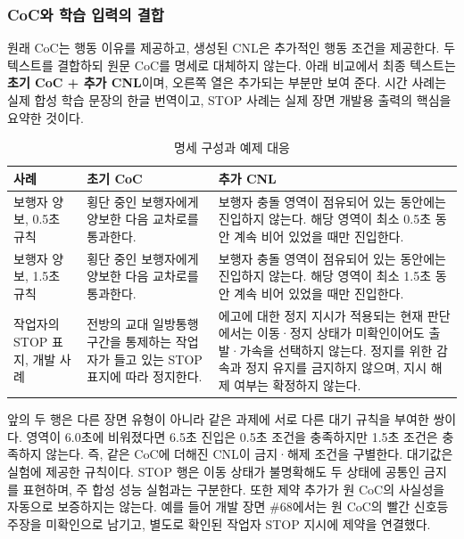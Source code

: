 \documentclass[10pt,a4paper,twocolumn]{article}\usepackage[margin=18mm]{geometry}\usepackage{fontspec,kotex}
\begin{document}
\subsubsection{CoC와 학습 입력의 결합}

원래 CoC는 행동 이유를 제공하고, 생성된 CNL은 추가적인 행동 조건을 제공한다. 두 텍스트를 결합하되 원문 CoC를 명세로 대체하지 않는다. 아래 비교에서 최종 텍스트는 \textbf{초기 CoC + 추가 CNL}이며, 오른쪽 열은 추가되는 부분만 보여 준다. 시간 사례는 실제 합성 학습 문장의 한글 번역이고, STOP 사례는 실제 장면 개발용 출력의 핵심을 요약한 것이다.\par

\begin{table}[tp]\caption{명세 구성과 예제 대응}
\centering\fontsize{8}{10}\selectfont\setlength{\tabcolsep}{3pt}
\begin{tabular}{@{}>{\raggedright\arraybackslash}p{}>{\raggedright\arraybackslash}p{}>{\raggedright\arraybackslash}p{}@{}}
\toprule
\textbf{사례} & \textbf{초기 CoC} & \textbf{추가 CNL}\\
\midrule
보행자 양보, 0.5초 규칙 & 횡단 중인 보행자에게 양보한 다음 교차로를 통과한다. & 보행자 충돌 영역이 점유되어 있는 동안에는 진입하지 않는다. 해당 영역이 최소 0.5초 동안 계속 비어 있었을 때만 진입한다.\\[3pt]
보행자 양보, 1.5초 규칙 & 횡단 중인 보행자에게 양보한 다음 교차로를 통과한다. & 보행자 충돌 영역이 점유되어 있는 동안에는 진입하지 않는다. 해당 영역이 최소 1.5초 동안 계속 비어 있었을 때만 진입한다.\\[3pt]
작업자의 STOP 표지, 개발 사례 & 전방의 교대 일방통행 구간을 통제하는 작업자가 들고 있는 STOP 표지에 따라 정지한다. & 에고에 대한 정지 지시가 적용되는 현재 판단에서는 이동·정지 상태가 미확인이어도 출발·가속을 선택하지 않는다. 정지를 위한 감속과 정지 유지를 금지하지 않으며, 지시 해제 여부는 확정하지 않는다.\\[3pt]
\bottomrule\end{tabular}
\end{table}

앞의 두 행은 다른 장면 유형이 아니라 같은 과제에 서로 다른 대기 규칙을 부여한 쌍이다. 영역이 6.0초에 비워졌다면 6.5초 진입은 0.5초 조건을 충족하지만 1.5초 조건은 충족하지 않는다. 즉, 같은 CoC에 더해진 CNL이 금지·해제 조건을 구별한다. 대기값은 실험에 제공한 규칙이다. STOP 행은 이동 상태가 불명확해도 두 상태에 공통인 금지를 표현하며, 주 합성 성능 실험과는 구분한다. 또한 제약 추가가 원 CoC의 사실성을 자동으로 보증하지는 않는다. 예를 들어 개발 장면 \#68에서는 원 CoC의 빨간 신호등 주장을 미확인으로 남기고, 별도로 확인된 작업자 STOP 지시에 제약을 연결했다.\par
\end{document}
